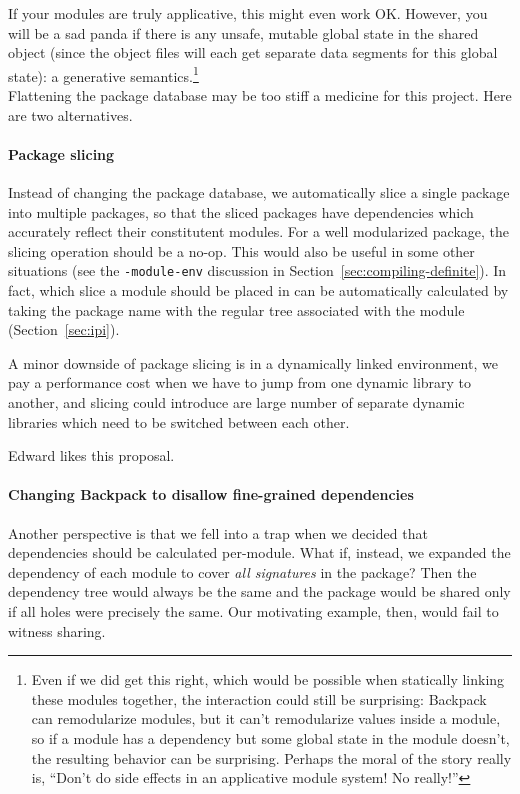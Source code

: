 \documentclass{article}
\begin{document}
If your modules are truly applicative, this might even work OK\@.  However, you will
be a sad panda if there is any unsafe, mutable global state in the shared
object (since the object files will each get separate data segments for this
global state): a generative semantics.\footnote{Even if we did get this right,
which would be possible when statically linking these modules together, the
interaction could still be surprising: Backpack can remodularize modules, but
it can't remodularize values inside a module, so if a module has a dependency
but some global state in the module doesn't, the resulting behavior can be
surprising.  Perhaps the moral of the story really is, ``Don't do side effects
in an applicative module system! No really!''} \\

\noindent Flattening the package database may be too stiff a medicine for this
project. Here are two alternatives.

\paragraph{Package slicing} Instead of changing the package database,
we automatically
slice a single package into multiple packages, so that the sliced
packages have dependencies which accurately reflect their constitutent
modules.  For a well modularized package, the slicing operation should
be a no-op.  This would also be useful in some other situations (see the
\verb|-module-env| discussion in Section~\ref{sec:compiling-definite}).
In fact, which slice a module should be placed in can be automatically
calculated by taking the package name with the regular tree
associated with the module (Section~\ref{sec:ipi}).

A minor downside of package slicing is in a dynamically linked environment,
we pay a performance cost when we have to jump from one dynamic library
to another, and slicing could introduce are large number of separate
dynamic libraries which need to be switched between each other.

Edward likes this proposal.

\paragraph{Changing Backpack to disallow fine-grained dependencies}

Another perspective is that we fell into a trap when we decided that
dependencies should be calculated per-module.  What if, instead, we
expanded the dependency of each module to cover \emph{all signatures}
in the package?  Then the dependency tree would always be the same and
the package would be shared only if all holes were precisely the same.
Our motivating example, then, would fail to witness sharing.
\end{document}
